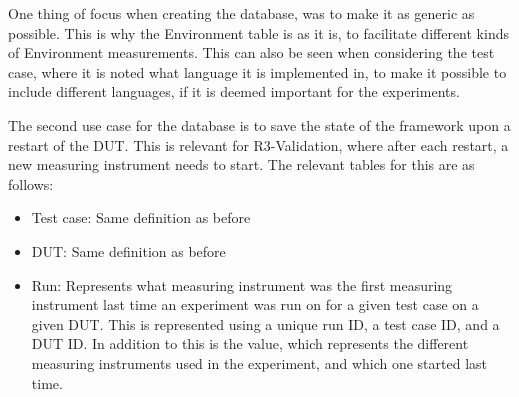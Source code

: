 One thing of focus when creating the database, was to make it as generic as possible. This is why the Environment table is as it is, to facilitate different kinds of Environment measurements. This can also be seen when considering the test case, where it is noted what language it is implemented in, to make it possible to include different languages, if it is deemed important for the experiments.\newline


The second use case for the database is to save the state of the framework upon a restart of the DUT. This is relevant for R3-Validation, where after each restart, a new measuring instrument needs to start. The relevant tables for this are as follows:

\begin{itemize}
    \item Test case: Same definition as before
    \item DUT: Same definition as before
    \item Run: Represents what measuring instrument was the first measuring instrument last time an experiment was run on for a given test case on a given DUT. This is represented using a unique run ID, a test case ID, and a DUT ID. In addition to this is the value, which represents the different measuring instruments used in the experiment, and which one started last time.
\end{itemize}

